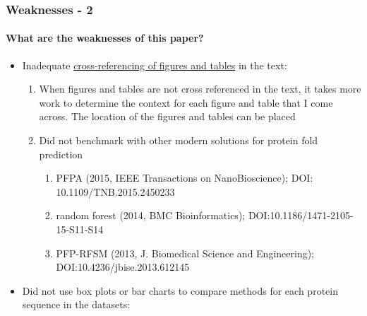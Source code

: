 \documentclass[xcolor={usenames,dvipsnames},hyperref={hyperindex,bookmarks}]{beamer}
\begin{document}
\frame
{
	\frametitle{Weaknesses - 2}
	\framesubtitle{What are the weaknesses of this paper?}

	\begin{itemize}
	\item Inadequate \href{https://blog.apastyle.org/apastyle/tables-and-figures/}{cross-referencing of figures and tables} in the text: 
		\begin{enumerate} 
		\item When figures and tables are not cross referenced in the text, it takes more work to determine the context for each figure and table that I come across. The location of the figures and tables can be placed
		\item Did not benchmark with other modern solutions for protein fold prediction
			\begin{enumerate} 
			\item PFPA (2015, IEEE Transactions on NanoBioscience); DOI: 10.1109/TNB.2015.2450233
			\item random forest (2014, BMC Bioinformatics); DOI:10.1186/1471-2105-15-S11-S14
			\item PFP-RFSM (2013, J. Biomedical Science and Engineering); DOI:10.4236/jbise.2013.612145 
			\end{enumerate}
		\end{enumerate}
	\item Did not use box plots or bar charts to compare methods for each protein sequence in the datasets:
	\end{itemize}
}
\end{document}
